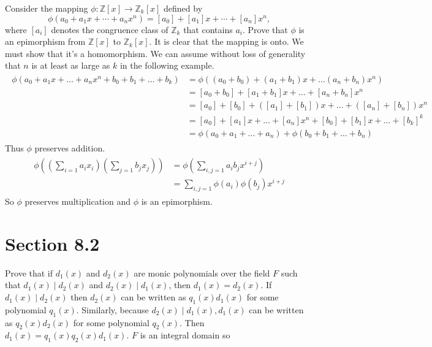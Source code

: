 \documentclass[paper=a4, fontsize=11pt]{jhwhw} %
\begin{document}
Consider the mapping $\phi: \mathbb Z[x] \to \mathbb Z_k[x]$ defined by 
$$\phi(a_0 + a_1x + \cdots + a_nx^n) = [a_0] + [a_1]x + \cdots + [a_n]x^n,$$
where $[a_i]$ denotes the congruence class of $\mathbb Z_k$ that contains $a_i$. Prove that $\phi$ is an epimorphism from $\mathbb Z[x]$ to $\mathbb Z_k[x]$.
\solution
It is clear that the mapping is onto. We must show that it's a homomorphism. We can assume without loss of generality that $n$ is at least as large as $k$ in the following example.
\begin{align}
    \begin{split}
        \phi(a_0 + a_1x + \ldots + a_nx^n + b_0 + b_1 + \ldots + b_k) &= \phi((a_0+b_0) + (a_1+b_1)x + \ldots (a_n + b_n)x^n)\\
        &= [a_0 + b_0] + [a_1 + b_1]x + \ldots + [a_n + b_n]x^n\\
        &= [a_0] + [b_0] + ([a_1] + [b_1])x + \ldots + ([a_n] + [b_n])x^n\\
        &= [a_0] + [a_1]x + \ldots + [a_n]x^n + [b_0] + [b_1]x + \ldots + [b_k]^k\\
        &= \phi(a_0 + a_1 + \ldots + a_n) + \phi(b_0 + b_1 + \ldots + b_n)
    \end{split}
\end{align}
Thus $\phi$ preserves addition. 
\begin{align}
    \begin{split}
        \phi((\sum\limits_{i=1}a_ix_i )(\sum\limits_{j=1}b_jx_j)) &= \phi(\sum\limits_{i,j=1}a_ib_jx^{i+j})\\
                                                                  &= \sum\limits_{i,j=1}\phi(a_i)\phi(b_j)x^{i+j}
    \end{split}
\end{align}
So $\phi$ preserves multiplication and $\phi$ is an epimorphism. 

\newpage
\section*{Section 8.2}
Prove that if $d_1(x)$ and $d_2(x)$ are monic polynomials over the field $F$ such that $d_1(x)\mid d_2(x)$ and $d_2(x)\mid d_1(x)$, then $d_1(x) = d_2(x)$.  
\solution
If $d_1(x)\mid d_2(x)$ then $d_2(x)$ can be written as $q_1(x)d_1(x)$ for some polynomial $q_1(x)$. Similarly, because $d_2(x)\mid d_1(x), d_1(x)$ can be written as $q_2(x)d_2(x)$ for some polynomial $q_2(x)$. Then $d_1(x) = q_1(x)q_2(x)d_1(x)$. $F$ is an integral domain so 
\end{document}
